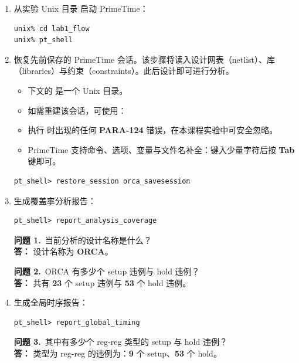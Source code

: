 \begin{enumerate}
  \item 从实验 Unix 目录  启动 PrimeTime：
\begin{lstlisting}
unix% cd lab1_flow
unix% pt_shell
\end{lstlisting}

  \item 恢复先前保存的 PrimeTime 会话。该步骤将读入设计网表（netlist）、库（libraries）与约束（constraints）。此后设计即可进行分析。

\begin{noteBox}
\begin{itemize}
  \item 下文的  是一个 Unix 目录。
  \item 如需重建该会话，可使用：\\
  \item 执行  时出现的任何 \textbf{PARA-124} 错误，在本课程实验中可安全忽略。
  \item PrimeTime 支持命令、选项、变量与文件名补全：键入少量字符后按 \textbf{Tab} 键即可。
\end{itemize}
\end{noteBox}

\begin{lstlisting}
pt_shell> restore_session orca_savesession
\end{lstlisting}

  \item 生成覆盖率分析报告：
\begin{lstlisting}
pt_shell> report_analysis_coverage
\end{lstlisting}

\begin{questionBox}
\textbf{问题 1.}\ 当前分析的设计名称是什么？\\[0.35em]
\textbf{答：} 设计名称为 \textbf{ORCA}。

\textbf{问题 2.}\ ORCA 有多少个 setup 违例与 hold 违例？\\[0.35em]
\textbf{答：} 共有 \textbf{23} 个 setup 违例与 \textbf{53} 个 hold 违例。
\end{questionBox}

  \item 生成全局时序报告：
\begin{lstlisting}
pt_shell> report_global_timing
\end{lstlisting}

\begin{questionBox}
\textbf{问题 3.}\ 其中有多少个 reg-reg 类型的 setup 与 hold 违例？\\[0.35em]
\textbf{答：} 类型为 reg-reg 的违例为：\textbf{9} 个 setup、\textbf{53} 个 hold。
\end{questionBox}
\end{enumerate}


